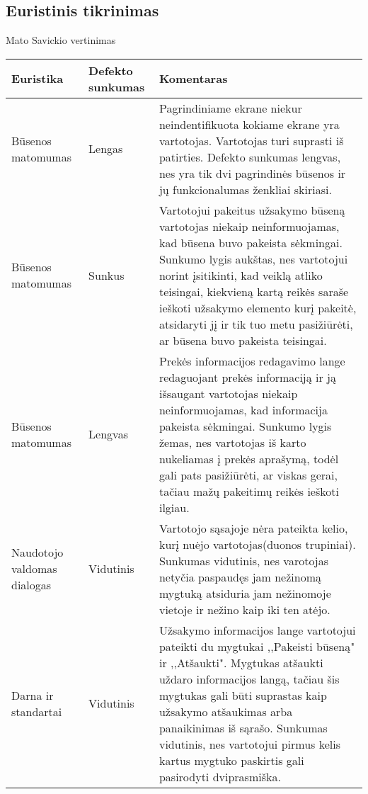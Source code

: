 \documentclass[oneside]{VUMIFPSkursinis}
\begin{document}
	\subsection{Euristinis tikrinimas}
Mato Savickio vertinimas
\begin{center}
    \begin{tabular}{ |p{3cm}| p{3cm} | p{11cm} | }
    \hline
	Euristika &Defekto sunkumas & Komentaras \\ \hline
	Būsenos matomumas & Lengas & Pagrindiniame ekrane niekur neindentifikuota kokiame ekrane yra vartotojas. 
						Vartotojas turi suprasti iš patirties. 
						Defekto sunkumas lengvas, nes yra tik dvi pagrindinės būsenos ir jų funkcionalumas ženkliai skiriasi. \\ \hline
	Būsenos matomumas & Sunkus & Vartotojui pakeitus užsakymo būseną vartotojas niekaip neinformuojamas, kad būsena buvo pakeista sėkmingai.
						Sunkumo lygis aukštas, nes vartotojui norint įsitikinti, kad veiklą atliko teisingai, kiekvieną kartą reikės saraše ieškoti užsakymo elemento kurį pakeitė, atsidaryti jį ir tik tuo metu pasižiūrėti, ar būsena buvo pakeista teisingai. \\ \hline
	Būsenos matomumas & Lengvas & Prekės informacijos redagavimo lange redaguojant prekės informaciją ir ją išsaugant vartotojas niekaip neinformuojamas, kad informacija pakeista sėkmingai.
						Sunkumo lygis žemas, nes vartotojas iš karto nukeliamas į prekės aprašymą, todėl gali pats pasižiūrėti, ar viskas gerai, tačiau mažų pakeitimų reikės ieškoti ilgiau. \\ \hline
	Naudotojo valdomas dialogas & Vidutinis & Vartotojo sąsajoje nėra pateikta kelio, kurį nuėjo vartotojas(duonos trupiniai). 
						Sunkumas vidutinis, nes varotojas netyčia paspaudęs jam nežinomą mygtuką atsiduria jam nežinomoje vietoje ir nežino kaip iki ten atėjo. \\ \hline
	Darna ir standartai & Vidutinis & Užsakymo informacijos lange vartotojui pateikti du mygtukai ,,Pakeisti būseną" ir ,,Atšaukti".
						Mygtukas atšaukti uždaro informacijos langą, tačiau šis mygtukas gali būti suprastas kaip užsakymo atšaukimas arba panaikinimas iš sąrašo. Sunkumas vidutinis, nes vartotojui pirmus kelis kartus mygtuko paskirtis gali pasirodyti dviprasmiška. \\ \hline

   \hline
    \end{tabular}
\end{center}
\end{document}
